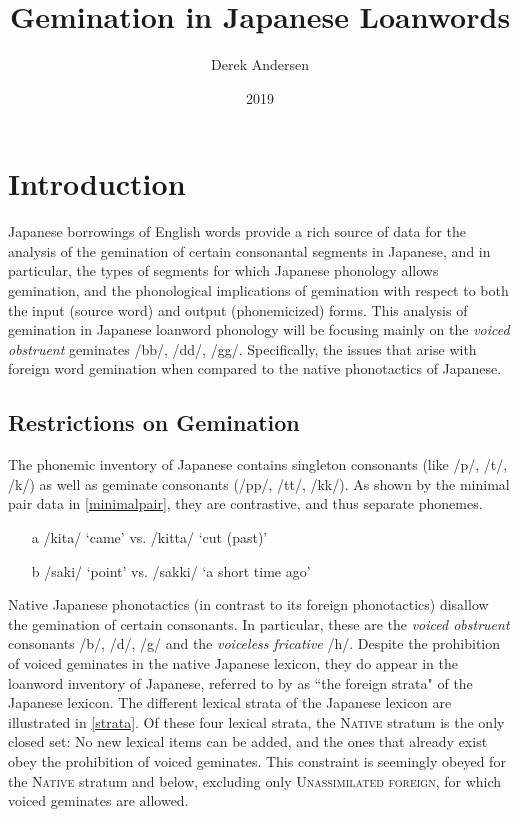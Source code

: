 \documentclass{article}
\title{Gemination in Japanese Loanwords}
\author{Derek Andersen}
\date{2019}
\begin{document}
\maketitle

\section{Introduction}
Japanese borrowings of English words provide a rich source of data for the analysis of the gemination of certain consonantal segments in Japanese, and in  particular, the types of segments for which Japanese phonology allows gemination, and the phonological  implications of gemination with respect to both the input (source word) and output (phonemicized) forms. This analysis of gemination in Japanese loanword phonology will be focusing mainly on the \textit{voiced obstruent} geminates /bb/, /dd/, /gg/. Specifically, the issues that arise with foreign word gemination when compared to the native phonotactics of Japanese.

\subsection{Restrictions on Gemination}

The phonemic inventory of Japanese contains singleton consonants (like /p/, /t/, /k/) as well as geminate consonants (/pp/, /tt/, /kk/). As shown by the minimal pair data in \ref{minimalpair}, they are contrastive, and thus separate phonemes.

\begin{exe}
    \ex
    \label{minimalpair}
    \begin{itemize}
        \item [a] /kita/ ‘came' vs. /kitta/ ‘cut (past)'
        \item [b] /saki/ ‘point' vs. /sakki/ ‘a short time ago'
    \end{itemize}
    
\end{exe}

Native Japanese phonotactics (in contrast to its foreign phonotactics) disallow the gemination of certain consonants. In particular, these are the \textit{voiced obstruent} consonants /b/, /d/, /g/ and the \textit{voiceless fricative} /h/. Despite the prohibition of voiced geminates in the native Japanese lexicon, they do appear in the loanword inventory of Japanese, referred to by \cite{Ito&Mester1999} as “the foreign strata" of the Japanese lexicon. The different lexical strata of the Japanese lexicon are illustrated in \ref{strata}. Of these four lexical strata, the \textsc{Native} stratum is the only closed set: No new lexical items can be added, and the ones that already exist obey the prohibition of voiced geminates. This constraint is seemingly obeyed for the \textsc{Native} stratum and below, excluding only \textsc{Unassimilated foreign}, for which voiced geminates are allowed.
\end{document}
